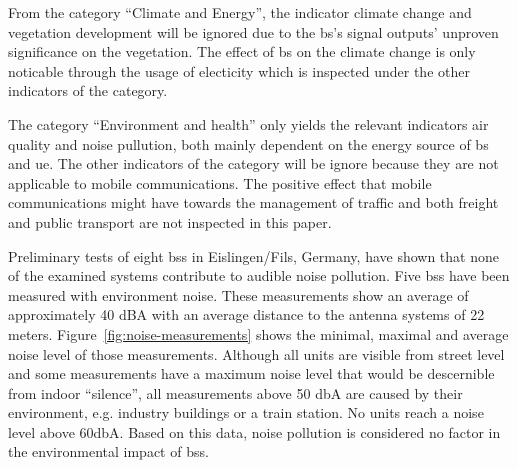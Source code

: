 \documentclass[11pt,a4paper]{article}
\begin{document}
From the category \enquote{Climate and Energy}, the indicator climate change and vegetation development will be ignored due to the \acrshort{bs}'s signal outputs' unproven significance on the vegetation.
The effect of \acrshort{bs} on the climate change is only noticable through the usage of electicity which is inspected under the other indicators of the category.

The category \enquote{Environment and health} only yields the relevant indicators air quality and noise pullution, both mainly dependent on the energy source of \acrshort{bs} and \acrshort{ue}.
The other indicators of the category will be ignore because they are not applicable to mobile communications.
The positive effect that mobile communications might have towards the management of traffic and both freight and public transport are not inspected in this paper.

Preliminary tests of eight \acrlong{bs}s in Eislingen/Fils, Germany, have shown that none of the examined systems contribute to audible noise pollution.
Five \acrshort{bs}s have been measured with environment noise.
These measurements show an average of approximately 40 dBA with an average distance to the antenna systems of 22 meters.
Figure~\ref{fig:noise-measurements} shows the minimal, maximal and average noise level of those measurements.
Although all units are visible from street level and some measurements have a maximum noise level that would be descernible from indoor \enquote{silence}, all measurements above 50 dbA are caused by their environment, e.g. industry buildings or a train station.
No units reach a noise level above 60dbA.
Based on this data, noise pollution is considered no factor in the environmental impact of \acrlong{bs}s.

\noiseData
\end{document}

